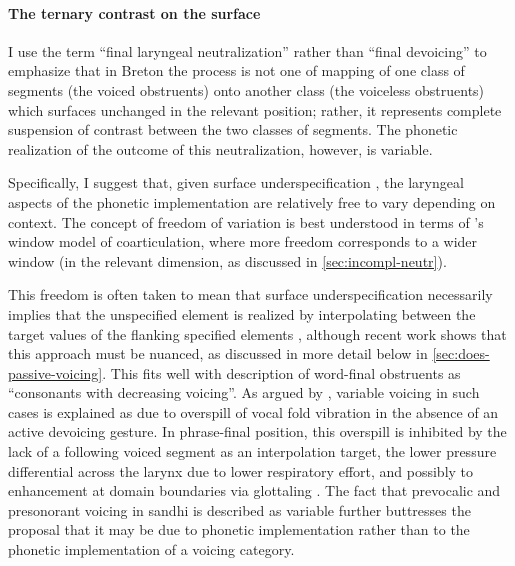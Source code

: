 \paragraph{The ternary contrast on the surface}
\label{sec:tern-contr-surf}

I use the term \enquote{final laryngeal neutralization} \citep{iverson11:_final} rather than \enquote{final devoicing} to emphasize that in Breton the process is not one of mapping of one class of segments (the voiced obstruents) onto another class (the voiceless obstruents) which surfaces unchanged in the relevant position; rather, it represents complete suspension of contrast \citep{steriade97:_phonet} between the two classes of segments. The phonetic realization of the outcome of this neutralization, however, is variable.

Specifically, I suggest that, given surface underspecification \citep{pierrehumbert88:_japan,keating88:_under,keating90:_phonet,keating96,jansen07,colina09:_sibil_ecuad_spanis}, the laryngeal aspects of the phonetic implementation are relatively free to vary depending on context. The concept of freedom of variation is best understood in terms of \citeauthor{keating88}'s \citeyearpar{keating88,keating90,keating96} window model of coarticulation, where more freedom corresponds to a wider window (in the relevant dimension, as discussed in \cref{sec:incompl-neutr}).

This freedom is often taken to mean that surface underspecification necessarily implies that the unspecified element is realized by interpolating between the target values of the flanking specified elements \citep{pierrehumbert88:_japan,cohn93:_nasal_englis,hsu98:_voicin_taiwan,colina09:_sibil_ecuad_spanis}, although recent work shows that this approach must be nuanced, as discussed in more detail below in \cref{sec:does-passive-voicing}. This fits well with  description of word-final obstruents as \enquote{consonants with decreasing voicing}. As argued by \citet{westbury86:_natur_stop_conson_voicin,jansen04:_laryn}, variable voicing in such cases is explained as due to overspill of vocal fold vibration in the absence of an active devoicing gesture. In phrase-final position, this overspill is inhibited by the lack of a following voiced segment as an interpolation target, the lower pressure differential across the larynx due to lower respiratory effort, and possibly to enhancement at domain boundaries via glottaling \citep{hock99:_final,blevins,iverson07:_domain_and_direc_in_evolut}. The fact that prevocalic and presonorant voicing in sandhi is described as variable further buttresses the proposal that it may be due to phonetic implementation rather than to the phonetic implementation of a voicing category.

